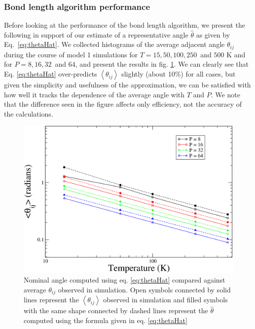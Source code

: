             \subsubsection{Bond length algorithm performance}
                \label{sec:blPerformance}
                Before looking at the performance of the bond length algorithm, we present the following in support of our estimate of a representative angle $\hat \theta$ as given by Eq.~\eqref{eq:thetaHat}. We collected histograms of the average adjacent angle $\theta_{ij}$ during the course of model 1 simulations for $T = 15, 50, 100, 250$~and $500$ K and for $P = 8, 16, 32$~and $64$, and present the results in fig. \ref{fig:nominal_angle}. We can clearly see that Eq. \eqref{eq:thetaHat} over-predicts $\left<\theta_{ij}\right>$ slightly (about 10\%) for all cases, but given the simplicity and usefulness of the approximation, we can be satisfied with how well it tracks the dependence of the average angle with $T$ and $P$. We note that the difference seen in the figure affects only efficiency, not the accuracy of the calculations.
                \begin{figure}[!htbp]
                    \centering
                    \includegraphics[scale=0.20,keepaspectratio]{Chapter-4/Figures/nominalAnglelogXlogY.png}
                    \caption{Nominal angle computed using eq. \eqref{eq:thetaHat} compared against average $\theta_{ij}$ observed in simulation. Open symbols connected by solid lines represent the $\left<\theta_{ij}\right>$ observed in simulation and filled symbols with the same shape connected by dashed lines represent the $\hat \theta$ computed using the formula given in eq. \eqref{eq:thetaHat}}
                    \label{fig:nominal_angle}
                \end{figure}

